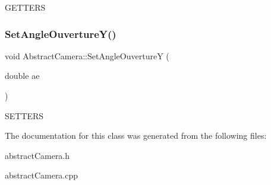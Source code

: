 G\+E\+T\+T\+E\+RS \mbox{\label{classAbstractCamera_a9da46dd6e5a6dc3c5095419fa6a540b7}} 
\subsubsection{\texorpdfstring{SetAngleOuvertureY()}{SetAngleOuvertureY()}}
{\footnotesize\ttfamily void Abstract\+Camera\+::\+Set\+Angle\+OuvertureY (\begin{DoxyParamCaption}\item[{double}]{ae }\end{DoxyParamCaption})}

S\+E\+T\+T\+E\+RS 

The documentation for this class was generated from the following files\+:\begin{DoxyCompactItemize}
\item 
abstract\+Camera.\+h\item 
abstract\+Camera.\+cpp\end{DoxyCompactItemize}
